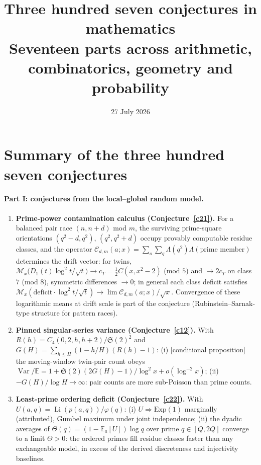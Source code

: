 \documentclass[11pt]{article}
\title{Three hundred seven conjectures in mathematics\\
\large Seventeen parts across arithmetic, combinatorics, geometry and probability}
\author{}
\date{27 July 2026}
\theoremstyle{definition}
\newcommand{\Li}{\operatorname{Li}}
\newcommand{\SG}{\mathfrak S}
\newcommand{\M}{\mathcal M}
\begin{document}
\maketitle

\section*{Summary of the three hundred seven conjectures}

\paragraph{Part I: conjectures from the local--global random model.}

\begin{enumerate}

\item \textbf{Prime-power contamination calculus
(Conjecture~\ref{c21}).}  For a balanced pair race $(n,n+d)$ mod
$m$, the surviving prime-square orientations
$(q^2-d,q^2)$, $(q^2,q^2+d)$ occupy provably computable residue
classes, and the operator
$\mathcal C_{d,m}(a;x)=\sum_{o}\sum_{q}\Lambda(q^2)\Lambda(\text{prime
member})$ determines the drift vector: for twins,
$\M_x\bigl(D_1(t)\log^2t/\sqrt t\bigr)\to c_T=\tfrac12C(x,x^2-2)$
(mod $5$) and $\to2c_T$ on class $7$ (mod $8$), symmetric
differences $\to0$; in general each class deficit satisfies
$\M_x(\mathrm{deficit}\cdot\log^2t/\sqrt t)\to\lim\mathcal
C_{d,m}(a;x)/\sqrt x$.  Convergence of these logarithmic means at
drift scale is part of the conjecture (Rubinstein--Sarnak-type
structure for pattern races).

\item \textbf{Pinned singular-series variance (Conjecture~\ref{c12}).}
With $R(h)=C_4(0,2,h,h+2)/\SG(2)^2$ and
$G(H)=\sum_{h\le H}(1-h/H)(R(h)-1)$: (i) [conditional proposition]
the moving-window twin-pair count obeys
$\operatorname{Var}/\mathbb E=1+\SG(2)(2G(H)-1)/\log^2x
+o(\log^{-2}x)$; (ii) $-G(H)/\log H\to\infty$: pair counts are more
sub-Poisson than prime counts.

\item \textbf{Least-prime ordering deficit (Conjecture~\ref{c22}).}
With $U(a,q)=\Li(p(a,q))/\varphi(q)$: (i) $U\Rightarrow\mathrm{Exp}(1)$
marginally (attributed), Gumbel maximum under joint independence;
(ii) the dyadic averages of $\Theta(q)=(1-\mathbb E_a[U])\log q$
over prime $q\in[Q,2Q]$ converge to a limit $\Theta>0$: the ordered
primes fill residue classes faster than any exchangeable model, in
excess of the derived discreteness and injectivity baselines.


\end{enumerate}
\end{document}

